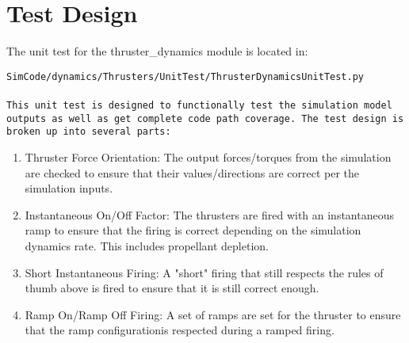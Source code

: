 \documentclass[]{LASPreport}
\begin{document}
\section{Test Design}
The unit test for the thruster\_dynamics module is located in:\\

\noindent
{\tt SimCode/dynamics/Thrusters/UnitTest/ThrusterDynamicsUnitTest.py \\
\\

\noindent This unit test is designed to functionally test the simulation model 
outputs as well as get complete code path coverage.  The test design is broken 
up into several parts:\\
\begin{enumerate}
\item{Thruster Force Orientation: The output forces/torques from the simulation 
  are checked to ensure that their values/directions are correct per the 
  simulation inputs.}
\item{Instantaneous On/Off Factor: The thrusters are fired with an 
  instantaneous ramp to ensure that the firing is correct depending on the 
  simulation dynamics rate.  This includes propellant depletion.}
\item{Short Instantaneous Firing: A "short" firing that still respects the 
  rules of thumb above is fired to ensure that it is still correct enough.}
\item{Ramp On/Ramp Off Firing: A set of ramps are set for the thruster to ensure 
  that the ramp configurationis respected during a ramped firing.}
\end{enumerate}


}
\end{document}
